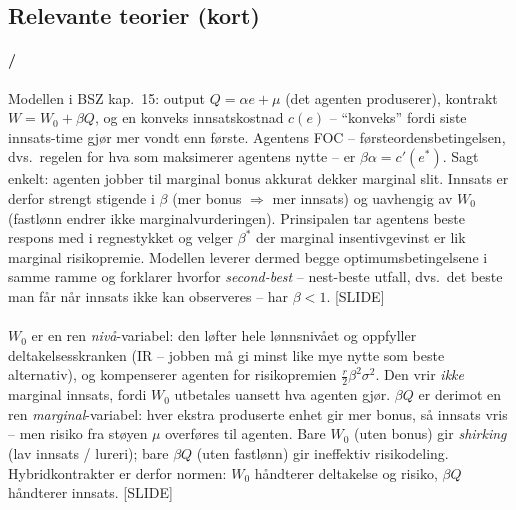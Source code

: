\subsection*{Relevante teorier (kort)}

\paragraph{\quad\STwo/\SThree}
Modellen i BSZ kap.\ 15: output $Q=\alpha e+\mu$ (det agenten produserer), kontrakt $W=W_0+\beta Q$, og en konveks innsatskostnad $c(e)$ -- ``konveks'' fordi siste innsats-time gjør mer vondt enn første. Agentens FOC -- førsteordensbetingelsen, dvs.\ regelen for hva som maksimerer agentens nytte -- er $\beta\alpha=c'(e^{*})$. Sagt enkelt: agenten jobber til marginal bonus akkurat dekker marginal slit. Innsats er derfor strengt stigende i $\beta$ (mer bonus $\Rightarrow$ mer innsats) og uavhengig av $W_0$ (fastlønn endrer ikke marginalvurderingen). Prinsipalen tar agentens beste respons med i regnestykket og velger $\beta^{*}$ der marginal insentivgevinst er lik marginal risikopremie. Modellen leverer dermed begge optimumsbetingelsene i samme ramme og forklarer hvorfor \emph{second-best} -- nest-beste utfall, dvs.\ det beste man får når innsats ikke kan observeres -- har $\beta<1$. [SLIDE]

\paragraph{\quad\SThree}
$W_0$ er en ren \emph{nivå}-variabel: den løfter hele lønnsnivået og oppfyller deltakelsesskranken (IR -- jobben må gi minst like mye nytte som beste alternativ), og kompenserer agenten for risikopremien $\tfrac{r}{2}\beta^{2}\sigma^{2}$. Den vrir \emph{ikke} marginal innsats, fordi $W_0$ utbetales uansett hva agenten gjør. $\beta Q$ er derimot en ren \emph{marginal}-variabel: hver ekstra produserte enhet gir mer bonus, så innsats vris -- men risiko fra støyen $\mu$ overføres til agenten. Bare $W_0$ (uten bonus) gir \emph{shirking} (lav innsats / lureri); bare $\beta Q$ (uten fastlønn) gir ineffektiv risikodeling. Hybridkontrakter er derfor normen: $W_0$ håndterer deltakelse og risiko, $\beta Q$ håndterer innsats. [SLIDE]

